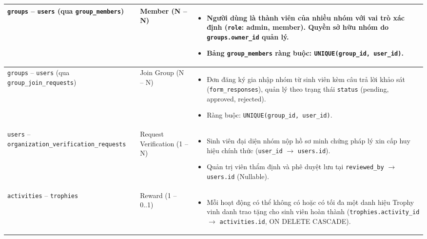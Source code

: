 \begin{longtable}{|p{}|p{}|p{}|}
    \texttt{groups} -- \texttt{users} \newline (qua \texttt{group\_members}) & Member \newline (N -- N) & 
    \begin{itemize}
        \item Người dùng là thành viên của nhiều nhóm với vai trò xác định (\texttt{role}: admin, member). Quyền sở hữu nhóm do \texttt{groups.owner\_id} quản lý.
        \item Bảng \texttt{group\_members} ràng buộc: \texttt{UNIQUE(group\_id, user\_id)}.
    \end{itemize} \\ \hline

    \texttt{groups} -- \texttt{users} \newline (qua \texttt{group\_join\_requests}) & Join Group \newline (N -- N) & 
    \begin{itemize}
        \item Đơn đăng ký gia nhập nhóm từ sinh viên kèm câu trả lời khảo sát (\texttt{form\_responses}), quản lý theo trạng thái \texttt{status} (pending, approved, rejected).
        \item Ràng buộc: \texttt{UNIQUE(group\_id, user\_id)}.
    \end{itemize} \\ \hline

    \texttt{users} -- \texttt{organization\_verification\_requests} & Request Verification \newline (1 -- N) & 
    \begin{itemize}
        \item Sinh viên đại diện nhóm nộp hồ sơ minh chứng pháp lý xin cấp huy hiệu chính thức (\texttt{user\_id} $\rightarrow$ \texttt{users.id}).
        \item Quản trị viên thẩm định và phê duyệt lưu tại \texttt{reviewed\_by} $\rightarrow$ \texttt{users.id} (Nullable).
    \end{itemize} \\ \hline

    \texttt{activities} -- \texttt{trophies} & Reward \newline (1 -- 0..1) & 
    \begin{itemize}
        \item Mỗi hoạt động có thể không có hoặc có tối đa một danh hiệu Trophy vinh danh trao tặng cho sinh viên hoàn thành (\texttt{trophies.activity\_id} $\rightarrow$ \texttt{activities.id}, ON DELETE CASCADE).
    \end{itemize} \\ \hline


\end{longtable}
